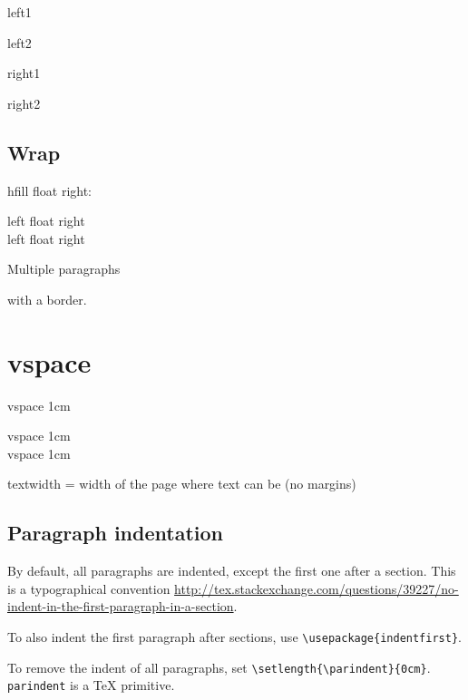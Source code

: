 \documentclass[12pt]{article}
\begin{document}
    \begin{minipage}[t]{0.5\textwidth}
      \flushleft
      left1

      left2
    \end{minipage}
    \hfill
    \begin{minipage}[t]{0.5\textwidth}
      \flushright
      right1

      right2
    \end{minipage}

  \subsection{Wrap}\label{wrap}

    hfill float right:

    left \hfill float right \\
    left \hfill float right \\

  \begin{boxedminipage}{\textwidth}
    Multiple paragraphs

    with a border.
  \end{boxedminipage}

  \section{vspace}\label{wrap}

    vspace 1cm

    \vspace{1cm}

    vspace 1cm \\[1cm]

    vspace 1cm

  textwidth = width of the page where text can be (no margins)

  \subsection{Paragraph indentation}\label{paragraph-indentation}

    By default, all paragraphs are indented, except the first one after a section. This is a typographical convention \url{http://tex.stackexchange.com/questions/39227/no-indent-in-the-first-paragraph-in-a-section}.

    To also indent the first paragraph after sections, use \lstinline|\usepackage{indentfirst}|.

    To remove the indent of all paragraphs, set \lstinline|\setlength{\parindent}{0cm}|. \lstinline|parindent| is a TeX primitive.
\end{document}
